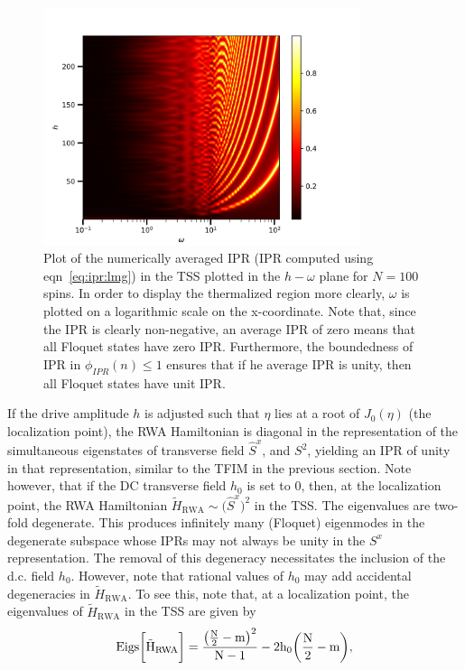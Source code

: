 \documentclass[%
reprint,
superscriptaddress,
amsmath,amssymb,
aps,
prb,
showkeys,
]{revtex4-2}
\begin{document}
	\begin{figure}[t!]
		\centering
		\includegraphics[width=9.3cm]{wh_phasespace.jpeg}
		\caption{Plot of the numerically averaged IPR (IPR computed using eqn~\ref{eq:ipr:lmg}) in the TSS plotted in the $h-\omega$ plane for $N=100$ spins. In order to display the thermalized region more clearly, $\omega$ is plotted on a logarithmic scale on the x-coordinate. Note that, since the IPR is clearly non-negative, an average IPR of zero means that all Floquet states have zero IPR. Furthermore, the boundedness of IPR in $\phi_{IPR}(n) \leq 1$ ensures that if he average IPR is unity, then all Floquet states have unit IPR.}
		\label{fig:lmg_phasediag}
	\end{figure}
	If the drive amplitude $h$ is adjusted such that $\eta$ lies at a root of $J_0(\eta)$ (the localization point), the RWA Hamiltonian is diagonal in the representation of the simultaneous eigenstates of transverse field $\hat{S}^x$, and $S^2$, yielding an IPR of unity in that representation, similar to the TFIM in the previous section. Note however, that if the DC transverse field $h_0$ is set to $0$, then, at the localization point, the RWA Hamiltonian $\tilde{H}_{\mathrm{RWA}}\sim
	\big(\hat{S}^x\big)^2$ in the TSS. The eigenvalues are two-fold degenerate. This produces infinitely many (Floquet) eigenmodes in the degenerate subspace whose IPRs may not always be unity in the $S^x$ representation. The removal of this degeneracy necessitates the inclusion of the d.c. field $h_0$. However, note that rational values of $h_0$
	may add accidental degeneracies in $\tilde{H}_{\mathrm{RWA}}$. To see this, note that, at a localization point, the eigenvalues of $\tilde{H}_{\mathrm{RWA}}$ in the TSS are given by
	\begin{equation}
		\rm{Eigs}\bigg[\tilde{H}_{\mathrm{RWA}}\bigg] = \frac{\big(\frac{N}{2}-m\big)^2}{N-1} - 2h_0 \bigg(\frac{N}{2}-m\bigg),
	\end{equation}
\end{document}
